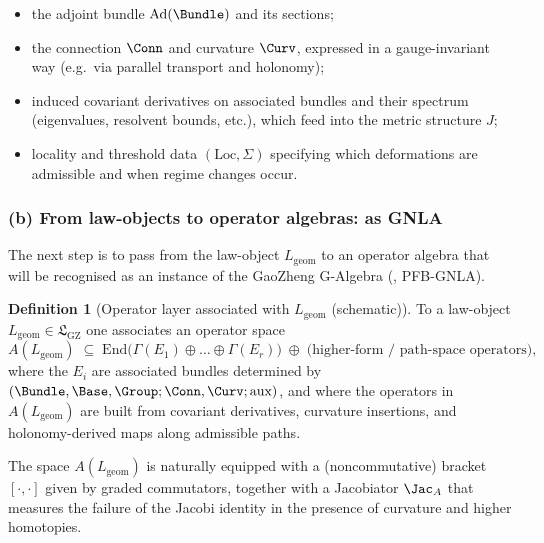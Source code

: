 \documentclass[11pt]{book}
\theoremstyle{plain}
\theoremstyle{definition}
\newtheorem{definition}[theorem]{Definition} \theoremstyle{remark}
\newcommand{\GZLS}{\ensuremath{\mathfrak{L}_{\mathrm{GZ}}}}       \newcommand{\GZLT}{\ensuremath{M_{!w}}}                           \newcommand{\GZLOC}{\ensuremath{A_M}}                             \newcommand{\GZLCurv}{\ensuremath{\mathcal{F}_{\mathrm{law}}}}
\begin{document}
\begin{itemize}
  \item the adjoint bundle $\mathrm{Ad}(\Bundle)$ and its sections;
  \item the connection $\Conn$ and curvature $\Curv$, expressed in a
        gauge-invariant way (e.g.\ via parallel transport and holonomy);
  \item induced covariant derivatives on associated bundles and their
        spectrum (eigenvalues, resolvent bounds, etc.), which feed into
        the metric structure $J$;
  \item locality and threshold data $(\mathrm{Loc},\Sigma)$ specifying
        which deformations are admissible and when regime changes occur.
\end{itemize}



\subsubsection*{(b) From law-objects to operator algebras: \GAlgebra as GNLA}

The next step is to pass from the law-object $L_{\mathrm{geom}}$ to an
operator algebra that will be recognised as an instance of the GaoZheng
G-Algebra (\GAlgebra, PFB-GNLA).

\begin{definition}[Operator layer associated with $L_{\mathrm{geom}}$ (schematic)]
To a law-object $L_{\mathrm{geom}}\in\GZLS$ one associates an operator
  space
  \[
     A(L_{\mathrm{geom}})
     \;\subseteq\;
     \mathrm{End}\bigl(\Gamma(E_1)\oplus\dots\oplus\Gamma(E_r)\bigr)
     \;\oplus\;
     \text{(higher-form / path-space operators)},
  \]
  where the $E_i$ are associated bundles determined by
  $(\Bundle,\Base,\Group;\Conn,\Curv;\text{aux})$, and where the
  operators in $A(L_{\mathrm{geom}})$ are built from covariant
  derivatives, curvature insertions, and holonomy-derived maps along
  admissible paths.
\end{definition}

The space $A(L_{\mathrm{geom}})$ is naturally equipped with a
(noncommutative) bracket $[\cdot,\cdot]$ given by graded commutators,
together with a Jacobiator $\Jac_{A}$ that measures the failure of the
Jacobi identity in the presence of curvature and higher homotopies.
\end{document}
